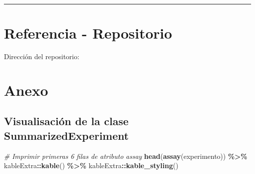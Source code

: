 \documentclass[
]{article}
\newenvironment{Shaded}{\begin{snugshade}}{\end{snugshade}}
\newcommand{\CommentTok}[1]{\textcolor[rgb]{0.56,0.35,0.01}{\textit{#1}}}
\newcommand{\FunctionTok}[1]{\textcolor[rgb]{0.13,0.29,0.53}{\textbf{#1}}}
\newcommand{\NormalTok}[1]{#1}
\newcommand{\SpecialCharTok}[1]{\textcolor[rgb]{0.81,0.36,0.00}{\textbf{#1}}}
\begin{document}
\begin{center}\rule{0.5\linewidth}{0.5pt}\end{center}

\section{Referencia - Repositorio}\label{referencia---repositorio}

Dirección del repositorio:

\section{Anexo}\label{anexo}

\subsection{Visualisación de la clase
SummarizedExperiment}\label{visualisaciuxf3n-de-la-clase-summarizedexperiment}

\begin{Shaded}
\begin{Highlighting}[]
\CommentTok{\# Imprimir primeras 6 filas de atributo assay}
\FunctionTok{head}\NormalTok{(}\FunctionTok{assay}\NormalTok{(experimento)) }\SpecialCharTok{\%\textgreater{}\%}
\NormalTok{  kableExtra}\SpecialCharTok{::}\FunctionTok{kable}\NormalTok{() }\SpecialCharTok{\%\textgreater{}\%}
\NormalTok{  kableExtra}\SpecialCharTok{::}\FunctionTok{kable\_styling}\NormalTok{()}
\end{Highlighting}
\end{Shaded}
\end{document}
